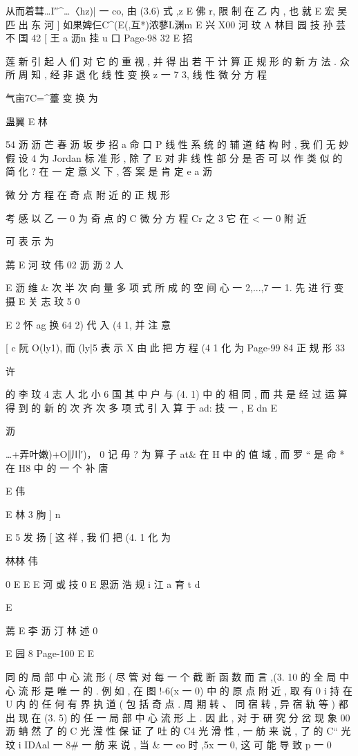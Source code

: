 {{{从而着彗…I″^…〈hz)| 一 co, 由 (3.6) 式 ,z E 佛 r, 限 制 在 乙 内 , 也 就
E 宏 吴
匹 出 东 河 ] 如果婢仨C^(E(,互*)浓蓼L渊m E 兴 X00 河 玟
A 林目 园 技 孙 芸 不
国 42
[ 王 a 沥n 挂 u 口
Page-98
32 E 招

莲
新 引 起 人 们 对 它 的 重 视 , 并 得 出 若 干 计 算 正 规 形 的 新 方 法 .
众 所 周 知 , 经 非 退 化 线 性 变 换 z 一 7 3, 线 性 微 分 方 程

气亩7C=^薹
变 换 为

蛊翼 E 林

54 沥 沥 芒 春 沥 坂 步 招 a 命 口 P
线 性 系 统 的 辅 道 结 构 时 , 我 们 无 妙 假 设 4 为 Jordan 标 准 形 , 除 了
E
对 非 线 性 部 分 是 否 可 以 作 类 似 的 简 化 ? 在 一 定 意 义 下 , 答 案 是 肯 定
e
a 沥

微 分 方 程 在 奇 点 附 近 的 正 规 形

考 感 以 乙 一 0 为 奇 点 的 C 微 分 方 程 Cr 之 3 它 在 < 一 0 附 近

可 表 示 为

蔫 E 河 玟 伟 02 沥 沥 2 人

E 沥
维 & 次 半 次 向 量 多 项 式 所 成 的 空 间 心 一 2,...,7 一 1.
先 进 行 变 摄
E 关 志 玟 5 0

E 2 怀 ag
换 64 2) 代 入 (4 1, 并 注 意

[ c
阮
O(ly1), 而 (ly|5 表 示 X %
由 此 把 方 程 (4 1 化 为
Page-99
84 正 规 形 33

许

的 李 玟 4 志 人 北 小 6 国
其 中 户 与 (4. 1) 中 的 相 同 , 而 共 是 经 过 运 算 得 到 的 新 的 次 齐 次
多 项 式
引 入 算 于 ad: 技 一 ,
E dn
E

沥

…+弄叶嫩)+O‖川′)， 0
记 毋 ? 为 算 子 at& 在 H 中 的 值 域 , 而 罗 “ 是 命 * 在 H8 中 的 一 个 补
唐

E 伟

E 林 3 朐 ]
n

E 5 发 扬 [
这 祥 , 我 们 把 (4. 1 化 为

林林 伟

0
E
E
E 河 或 技 0
E 恩沥 浩 规 i 江 a 育 t d

E

蔫 E 李 沥 汀 林 述 0

E 园 8
Page-100
E E

同 的 局 部 中 心 流 形 ( 尽 管 对 每 一 个 截 断 函 数 而 言 ,(3. 10 的 全 局
中 心 流 形 是 唯 一 的 . 例 如 , 在 图 !-6(x 一 0) 中 的 原 点 附 近 , 取 有
0
i
持 在 U 内 的 任 何 有 界 执 道 ( 包 括 奇 点 . 周 期 转 、 同 宿 转 , 异 宿 轨 等 )
都 出 现 在 (3. 5) 的 任 一 局 部 中 心 流 形 上 . 因 此 , 对 于 研 究 分 岔 现 象
00 沥
蚺 然 了 的 C 光 滢 性 保 证 了 吐 的 C4 光 滑 性 , 一 舫 来 说 , 了 的 C“ 光
玟
i
IDAal 一 8# 一 舫 来 说 , 当 & 一 eo 时 ,5x 一 0, 这 可 能 导 致 p 一 0

}}}
